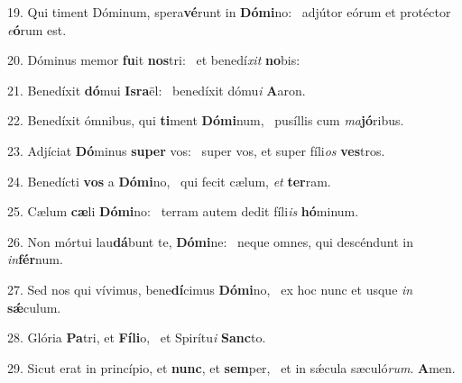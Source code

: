 19. Qui timent Dóminum, spera\textbf{vé}runt in \textbf{Dó}\textbf{mi}no: \ast\  adjútor eórum et protéctor \textit{e}\textbf{ó}rum est.\

20. Dóminus memor \textbf{fu}it \textbf{nos}tri: \ast\  et benedí\textit{xit} \textbf{no}bis:\

21. Benedíxit \textbf{dó}mui \textbf{Is}\textbf{ra}ël: \ast\  benedíxit dómu\textit{i} \textbf{A}aron.\

22. Benedíxit ómnibus, qui \textbf{ti}ment \textbf{Dó}\textbf{mi}num, \ast\  pusíllis cum \textit{ma}\textbf{jó}ribus.\

23. Adjíciat \textbf{Dó}minus \textbf{su}\textbf{per} vos: \ast\  super vos, et super fíli\textit{os} \textbf{ves}tros.\

24. Benedícti \textbf{vos} a \textbf{Dó}\textbf{mi}no, \ast\  qui fecit cælum, \textit{et} \textbf{ter}ram.\

25. Cælum \textbf{cæ}li \textbf{Dó}\textbf{mi}no: \ast\  terram autem dedit fíli\textit{is} \textbf{hó}minum.\

26. Non mórtui lau\textbf{dá}bunt te, \textbf{Dó}\textbf{mi}ne: \ast\  neque omnes, qui descéndunt in \textit{in}\textbf{fér}num.\

27. Sed nos qui vívimus, bene\textbf{dí}cimus \textbf{Dó}\textbf{mi}no, \ast\  ex hoc nunc et usque \textit{in} \textbf{sǽ}culum.\

28. Glória \textbf{Pa}tri, et \textbf{Fí}\textbf{li}o, \ast\  et Spirítu\textit{i} \textbf{Sanc}to.\

29. Sicut erat in princípio, et \textbf{nunc}, et \textbf{sem}per, \ast\  et in sǽcula sæculó\textit{rum}. \textbf{A}men.\

